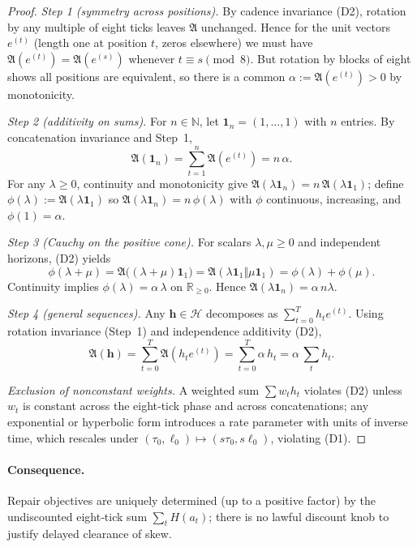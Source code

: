 \documentclass[11pt]{article}
\begin{document}
\begin{proof}
\emph{Step 1 (symmetry across positions).} By cadence invariance (D2), rotation by any multiple of eight ticks leaves $\mathfrak{A}$ unchanged. Hence for the unit vectors $e^{(t)}$ (length one at position $t$, zeros elsewhere) we must have $\mathfrak{A}(e^{(t)})=\mathfrak{A}(e^{(s)})$ whenever $t\equiv s \pmod 8$. But rotation by blocks of eight shows all positions are equivalent, so there is a common $\alpha:=\mathfrak{A}(e^{(t)})>0$ by monotonicity.

\emph{Step 2 (additivity on sums).} For $n\in\mathbb{N}$, let $\mathbf{1}_n=(1,\dots,1)$ with $n$ entries. By concatenation invariance and Step~1,
\[
\mathfrak{A}(\mathbf{1}_n)=\sum_{t=1}^n \mathfrak{A}(e^{(t)})=n\,\alpha.
\]
For any $\lambda\ge 0$, continuity and monotonicity give $\mathfrak{A}(\lambda \mathbf{1}_n)=n\,\mathfrak{A}(\lambda \mathbf{1}_1)$; define $\phi(\lambda):=\mathfrak{A}(\lambda \mathbf{1}_1)$ so $\mathfrak{A}(\lambda \mathbf{1}_n)=n\,\phi(\lambda)$ with $\phi$ continuous, increasing, and $\phi(1)=\alpha$.

\emph{Step 3 (Cauchy on the positive cone).} For scalars $\lambda,\mu\ge 0$ and independent horizons, (D2) yields
\[
\phi(\lambda+\mu)=\mathfrak{A}\big((\lambda+\mu)\mathbf{1}_1\big)
=\mathfrak{A}(\lambda \mathbf{1}_1\Vert \mu \mathbf{1}_1)
=\phi(\lambda)+\phi(\mu).
\]
Continuity implies $\phi(\lambda)=\alpha\,\lambda$ on $\mathbb{R}_{\ge 0}$. Hence $\mathfrak{A}(\lambda \mathbf{1}_n)=\alpha\, n\lambda$.

\emph{Step 4 (general sequences).} Any $\mathbf{h}\in\mathcal{H}$ decomposes as $\sum_{t=0}^{T} h_t e^{(t)}$. Using rotation invariance (Step~1) and independence additivity (D2),
\[
\mathfrak{A}(\mathbf{h})=\sum_{t=0}^T \mathfrak{A}(h_t e^{(t)})=\sum_{t=0}^T \alpha\, h_t=\alpha\,\sum_t h_t.
\]

\emph{Exclusion of nonconstant weights.} A weighted sum $\sum w_t h_t$ violates (D2) unless $w_t$ is constant across the eight‑tick phase and across concatenations; any exponential or hyperbolic form introduces a rate parameter with units of inverse time, which rescales under $(\tau_0,\ell_0)\mapsto(s\tau_0,s\ell_0)$, violating (D1).
\end{proof}

\paragraph{Consequence.}
Repair objectives are uniquely determined (up to a positive factor) by the undiscounted eight‑tick sum $\sum_t H(a_t)$; there is no lawful discount knob to justify delayed clearance of skew.
\end{document}
